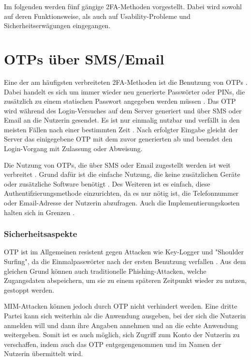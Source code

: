 \pskip
Im folgenden werden fünf gängige \ac{2FA}-Methoden vorgestellt. Dabei wird sowohl auf deren Funktionsweise, als auch auf Usability-Probleme und Sicherheitserwägungen eingegangen.

\section{OTPs über SMS/Email}
Eine der am häufigsten verbreiteten \ac{2FA}-Methoden ist die Benutzung von \acp{OTP} \parencite{decristofaroComparativeUsability2014}. Dabei handelt es sich um immer wieder neu generierte Passwörter oder PINs, die zusätzlich zu einem statischen Passwort angegeben werden müssen \parencite{geramiOneTimePasswords2016}. Das \ac{OTP} wird während des Login-Versuches auf dem Server generiert und über \acs{SMS} oder Email an die Nutzerin gesendet. Es ist nur einmalig nutzbar und verfällt in den meisten Fällen nach einer bestimmten Zeit \parencite{geramiOneTimePasswords2016}. Nach erfolgter Eingabe gleicht der Server das einigegebene \ac{OTP} mit dem zuvor generierten ab und beendet den Login-Vorgang mit Zulassung oder Abweisung.

Die Nutzung von \acp{OTP}, die über SMS oder Email zugestellt werden ist weit verbreitet \parencite{decristofaroComparativeUsability2014}. Grund dafür ist die einfache Nutzung, die keine zusätzlichen Geräte oder zusätzliche Software benötigt \parencite{abhishekComprehensiveStudy2013}. Des Weiteren ist es einfach, diese Authentifzierungsmethode einzurichten, da es nur nötig ist, die Telefonnummer oder Email-Adresse der Nutzerin abzufragen. Auch die Implementierungskosten halten sich in Grenzen \parencite{abhishekComprehensiveStudy2013}.

\subsubsection{Sicherheitsaspekte}
\ac{OTP} ist im Allgemeinen resistent gegen Attacken wie Key-Logger und "Shoulder Surfing", da die Einmalpasswörter nach der ersten Benutzung verfallen \parencite{abhishekComprehensiveStudy2013}. Aus dem gleichen Grund können auch traditionelle Phishing-Attacken, welche Zugangsdaten abspeichern, um sie zu einem späteren Zeitpunkt wieder zu nutzen, gestoppt werden.

\ac{MIM}-Attacken können jedoch durch \ac{OTP} nicht verhindert werden. Eine dritte Partei kann sich weiterhin als die Anwendung ausgeben, bei der sich die Nutzerin anmelden will und dann ihre Angaben annehmen und an die echte Anwendung weitergeben. Somit ist es auch möglich, sich Zugriff zum Konto der Nutzerin zu verschaffen, indem auch das \ac{OTP} entgegengenommen und im Namen der Nutzerin übermittelt wird.

